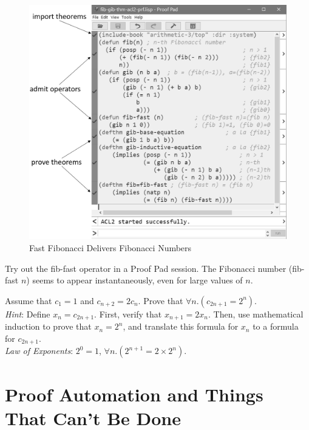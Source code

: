 \begin{figure}
\begin{center}
\includegraphics[scale=0.5]{images/fib-gib-thm-acl2-prf.png}
\end{center}
\caption{Fast Fibonacci Delivers Fibonacci Numbers}
\label{fig:fib-gib-thm}
\end{figure}

Try out the fib-fast operator in a Proof Pad session.
The Fibonacci number (fib-fast $n$) seems to appear
instantaneously, even for large values of $n$.

\begin{ExerciseList}

\Exercise Assume that $c_1 = 1$ and $c_{n+2} = 2c_n$.
Prove that $\forall n.(c_{2n+1} = 2^n)$.\\
\emph{Hint}: Define $x_n = c_{2n+1}$.
First, verify that $x_{n+1} = 2x_n$.
Then, use mathematical induction to prove that $x_n = 2^n$,
and translate this formula for $x_n$
to a formula for $c_{2n+1}$.\\
\emph{Law of Exponents}: $2^0 = 1$, $\forall n.(2^{n+1} = 2 \times 2^n)$.

\end{ExerciseList}

\section{Proof Automation and Things That Can't Be Done}
\label{sec:halting-problem}

